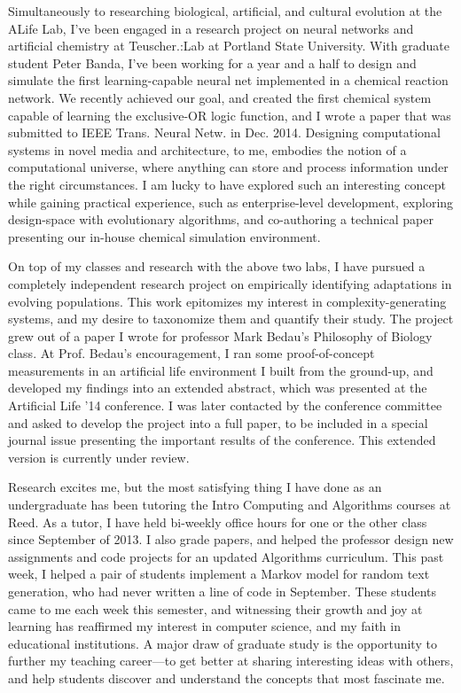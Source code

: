 Simultaneously to researching biological, artificial, and cultural evolution at the ALife Lab, I've been engaged in a research project on neural networks and artificial chemistry at Teuscher.:Lab at Portland State University. With graduate student Peter Banda, I've been working for a year and a half to design and simulate the first learning-capable neural net implemented in a chemical reaction network. We recently achieved our goal, and created the first chemical system capable of learning the exclusive-OR logic function, and I wrote a paper that was submitted to IEEE Trans. Neural Netw. in Dec. 2014. Designing computational systems in novel media and architecture, to me, embodies the notion of a computational universe, where anything can store and process information under the right circumstances. I am lucky to have explored such an interesting concept while gaining practical experience, such as enterprise-level development, exploring design-space with evolutionary algorithms, and co-authoring a technical paper presenting our in-house chemical simulation environment.

On top of my classes and research with the above two labs, I have pursued a completely independent research project on empirically identifying adaptations in evolving populations. This work epitomizes my interest in complexity-generating systems, and my desire to taxonomize them and quantify their study. The project grew out of a paper I wrote for professor Mark Bedau's Philosophy of Biology class. At Prof. Bedau's encouragement, I ran some proof-of-concept measurements in an artificial life environment I built from the ground-up, and developed my findings into an extended abstract, which was presented at the Artificial Life '14 conference. I was later contacted by the conference committee and asked to develop the project into a full paper, to be included in a special journal issue presenting the important results of the conference. This extended version is currently under review.

Research excites me, but the most satisfying thing I have done as an undergraduate has been tutoring the Intro Computing and Algorithms courses at Reed. As a tutor, I have held bi-weekly office hours for one or the other class since September of 2013. I also grade papers, and helped the professor design new assignments and code projects for an updated Algorithms curriculum. This past week, I helped a pair of students implement a Markov model for random text generation, who had never written a line of code in September. These students came to me each week this semester, and witnessing their growth and joy at learning has reaffirmed my interest in computer science, and my faith in educational institutions. A major draw of graduate study is the opportunity to further my teaching career---to get better at sharing interesting ideas with others, and help students discover and understand the concepts that most fascinate me.

